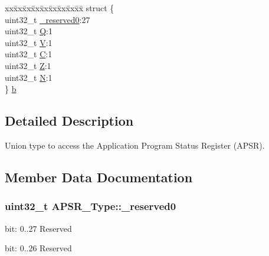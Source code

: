 \begin{DoxyCompactItemize}
\begin{tabbing}
\end{tabbing}\item 
\begin{tabbing}
xx\=xx\=xx\=xx\=xx\=xx\=xx\=xx\=xx\=\kill
struct \{\\
\>uint32\_t \hyperlink{union_a_p_s_r___type_afbce95646fd514c10aa85ec0a33db728}{\_reserved0}:27\\
\>uint32\_t \hyperlink{union_a_p_s_r___type_a22d10913489d24ab08bd83457daa88de}{Q}:1\\
\>uint32\_t \hyperlink{union_a_p_s_r___type_a8004d224aacb78ca37774c35f9156e7e}{V}:1\\
\>uint32\_t \hyperlink{union_a_p_s_r___type_a86e2c5b891ecef1ab55b1edac0da79a6}{C}:1\\
\>uint32\_t \hyperlink{union_a_p_s_r___type_a3b04d58738b66a28ff13f23d8b0ba7e5}{Z}:1\\
\>uint32\_t \hyperlink{union_a_p_s_r___type_a7e7bbba9b00b0bb3283dc07f1abe37e0}{N}:1\\
\} \hyperlink{union_a_p_s_r___type_a9d6e85a85f395a3b51e915420fe081de}{b}\\

\end{tabbing}\end{DoxyCompactItemize}


\subsection{Detailed Description}
Union type to access the Application Program Status Register (A\-P\-S\-R). 

\subsection{Member Data Documentation}
\hypertarget{union_a_p_s_r___type_afbce95646fd514c10aa85ec0a33db728}{
\subsubsection[{\-\_\-reserved0}]{\setlength{\rightskip}{0pt plus 5cm}uint32\-\_\-t A\-P\-S\-R\-\_\-\-Type\-::\-\_\-reserved0}}\label{union_a_p_s_r___type_afbce95646fd514c10aa85ec0a33db728}
bit\-: 0..27 Reserved

bit\-: 0..26 Reserved

